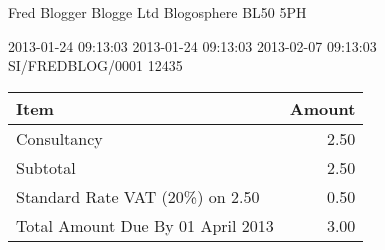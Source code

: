 \documentclass{samplesalesinvoice}
\begin{document}
\customertable
    {Fred Blogger}
    {Blogge Ltd}
    {}
    {}
    {Blogosphere}
    {}
    {BL50 5PH}


\gsdocmeta
    {2013-01-24 09:13:03}
    {2013-01-24 09:13:03}
    {2013-02-07 09:13:03}
    {SI/FREDBLOG/0001}
    {12435}

\gsfixedwidth
\begin{longtable}{|p{460pt}|r|}
\hline
\bf Item & \bf Amount \\
\hline\hline
Consultancy & 2.50 \\
\hline
Subtotal & 2.50\\
Standard Rate VAT (20\%) on 2.50 & 0.50\\
\hline\hline
Total Amount Due By 01 April 2013 & 3.00 \\
\hline
\end{longtable}
\end{document}
